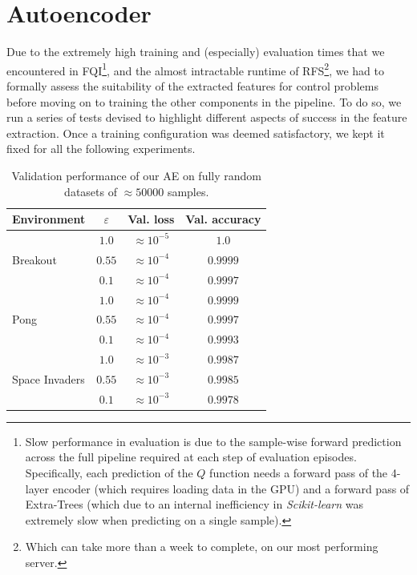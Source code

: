 %

\section{Autoencoder}
Due to the extremely high training and (especially) evaluation times that we 
encountered in FQI\footnote{Slow performance in evaluation is due to the 
sample-wise forward prediction across the full pipeline required at each step
of evaluation episodes. Specifically, each prediction of the $Q$ function needs 
a forward pass of the 4-layer encoder (which requires loading data in the GPU)
and a forward pass of Extra-Trees (which due to an internal inefficiency in 
\textit{Scikit-learn} was extremely slow when predicting on a single sample).},
and the almost intractable runtime of RFS\footnote{Which can take more than a 
week to complete, on our most performing server.}, we had to formally assess the 
suitability of the extracted features for control problems before moving on to 
training the other components in the pipeline. 
To do so, we run a series of tests devised to highlight different aspects of
success in the feature extraction. Once a training configuration was deemed 
satisfactory, we kept it fixed for all the following experiments.
%
\begin{table}
    \centering
    \begin{tabular}{l c c c} 
	\hline
	Environment                     & $\varepsilon$ & Val. loss        & Val. accuracy \\ 
	\hline 
	\multirow{3}{*}{Breakout}       & $1.0$         & $\approx10^{-5}$ & $1.0$    \\
	                                & $0.55$        & $\approx10^{-4}$ & $0.9999$ \\
	                                & $0.1$         & $\approx10^{-4}$ & $0.9997$ \\
	\hline
	\multirow{3}{*}{Pong}           & $1.0$         & $\approx10^{-4}$ & $0.9999$ \\ 
	                                & $0.55$        & $\approx10^{-4}$ & $0.9997$ \\
	                                & $0.1$         & $\approx10^{-4}$ & $0.9993$    \\
	\hline
	\multirow{3}{*}{Space Invaders} & $1.0$         & $\approx10^{-3}$ & $0.9987$ \\
	                                & $0.55$        & $\approx10^{-3}$ & $0.9985$ \\
	                                & $0.1$         & $\approx10^{-3}$ & $0.9978$ \\
	\hline
    \end{tabular}
    \caption[AE validation performance]{Validation performance of our AE on
	     fully random datasets of $\approx50000$ samples.}
    \label{t:ae_training_precision}
\end{table}
